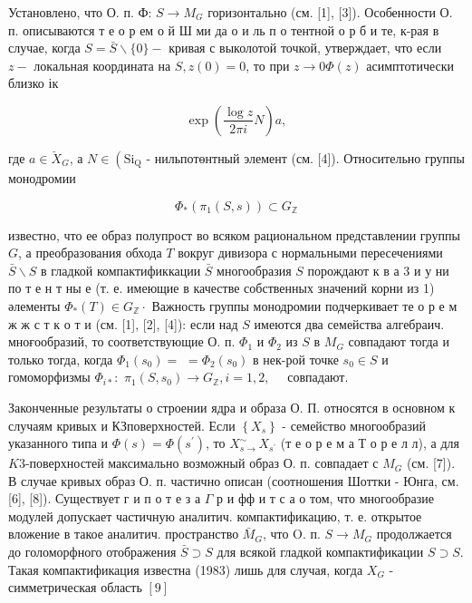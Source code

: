 \documentclass[10pt]{article}
\begin{document}
Установлено, что О. п. Ф: $S \rightarrow M_{G}$ горизонтально (см. [1], [3]). Особенности О. п. описываются т е о р ем о й Ш ми да о и ль п о тентной о р б и те, к-рая в случае, когда $S=\bar{S} \backslash\{0\}-$ кривая с выколотой точкой, утверждает, что если $z-$ локальная координата на $S, z(0)=0$, то при $z \rightarrow 0 \Phi(z)$ асимптотически близко ік



\[

\exp \left(\frac{\log z}{2 \pi i} N\right) a,

\]



где $a \in \breve{X}_{G}$, а $N \in\left(\mathrm{Si}_{\mathrm{Q}}\right.$ - нильпотөнтный элемент (см. [4]). Относительно группы монодромии



\[

\Phi_{*}\left(\pi_{1}(S, s)\right) \subset G_{\mathbb{Z}}

\]



известно, что ее образ полупрост во всяком рациональном представлении группы $G$, а преобразования обхода $T$ вокруг дивизора с нормальными пересечениями $\bar{S} \backslash S$ в гладкой компактификкации $\bar{S}$ многообразия $S$ порождают к в а 3 и у ни по т е н т ны е (т. е. имеющие в качестве собственных значений корни из 1) әлементы $\Phi_{*}(T) \in G_{\mathbb{Z}} \cdot$ Важность группы монодромии подчеркивает те о р е м ж ж с т к о т и (см. [1], [2], [4]): если над $S$ имеются два семейства алгебраич. мноғообразий, то соответствующие О. п. $\Phi_{1}$ и $\Phi_{2}$ из $S$ в $M_{G}$ совпадают тогда и только тогда, когда $\Phi_{1}\left(s_{0}\right)=$ $=\Phi_{2}\left(s_{0}\right)$ в нек-рой точке $s_{0} \in S$ и гомоморфизмы $\Phi_{i *}:$ $\pi_{1}\left(S, s_{0}\right) \rightarrow G_{\mathbb{Z}}, i=1,2, \quad$ совпадают.



Законченные результаты о строении ядра и образа О. П. относятся в основном к случаям кривых и КЗповерхностей. Если $\left\{X_{s}\right\}$ - семейство многообразий указанного типа и $\Phi(s)=\Phi\left(s^{\prime}\right)$, то $X_{s \rightarrow}^{\sim} X_{s^{\prime}}$ (т е о р е м а Т о р е л л), а для $K 3$-поверхностей максимально возможный образ О. п. совпадает с $M_{G}$ (см. [7]). В случае кривых образ О. п. частично описан (соотношения Шоттки - Юнга, см. [6], [8]). Существует г и п о т е з а $\Gamma$ р и фф и т с а о том, что многообразие модулей допускает частичную аналитич. компактификацию, т. е. открытое вложение в такое аналитич. пространство $\bar{M}_{G}$, что O. п. $S \rightarrow M_{G}$ продолжается до голоморфного отображения $\bar{S} \supset S$ для всякой гладкой компактификации $S \supset S$. Такая компактификация известна (1983) лишь для случая, когда $X_{G}$ - симметрическая область $[9]$
\end{document}
